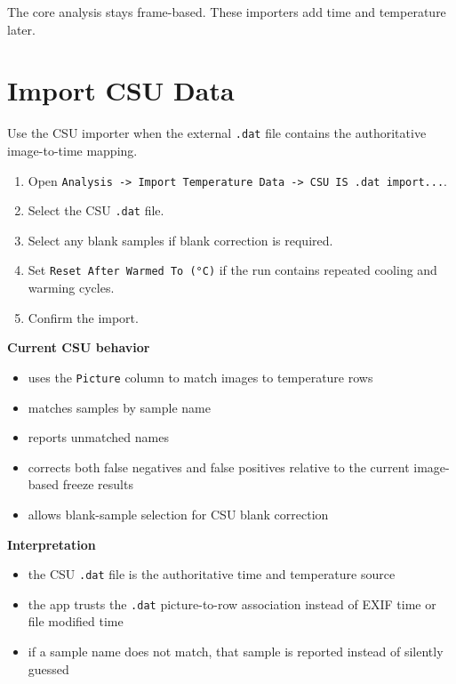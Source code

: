 \documentclass[
  9pt,
  letterpaper,
  oneside,
  open=any,
  DIV=15,
  parskip=half-,
  headings=big,
  numbers=noenddot
]{scrbook}
\newcommand{\manuallead}[1]{%
  \vspace{0.15em}%
  {\sffamily\bfseries\color{ManualBlue}#1}\par\nobreak\vspace{0.05em}%
}
\begin{document}
The core analysis stays frame-based. These importers add time and temperature later.


\section{Import CSU Data}

Use the CSU importer when the external \texttt{.dat} file contains the authoritative image-to-time mapping.


\begin{enumerate}[leftmargin=*,itemsep=0.35em,topsep=0.4em]
\item Open \texttt{Analysis -> Import Temperature Data -> CSU IS .dat import...}.
\item Select the CSU \texttt{.dat} file.
\item Select any blank samples if blank correction is required.
\item Set \texttt{Reset After Warmed To (°C)} if the run contains repeated cooling and warming cycles.
\item Confirm the import.
\end{enumerate}

\manuallead{Current CSU behavior}

\begin{itemize}[leftmargin=*,itemsep=0.35em,topsep=0.4em]
\item uses the \texttt{Picture} column to match images to temperature rows
\item matches samples by sample name
\item reports unmatched names
\item corrects both false negatives and false positives relative to the current image-based freeze results
\item allows blank-sample selection for CSU blank correction
\end{itemize}

\manuallead{Interpretation}

\begin{itemize}[leftmargin=*,itemsep=0.35em,topsep=0.4em]
\item the CSU \texttt{.dat} file is the authoritative time and temperature source
\item the app trusts the \texttt{.dat} picture-to-row association instead of EXIF time or file modified time
\item if a sample name does not match, that sample is reported instead of silently guessed
\end{itemize}
\end{document}
